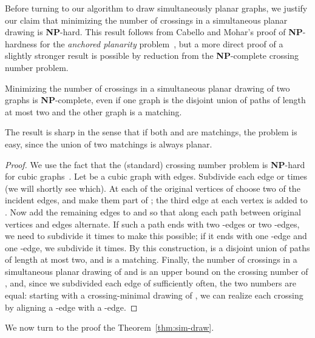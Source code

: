 \documentclass{llncs}
\newcommand{\NP}{\mbox{\bfseries NP}}
\begin{document}
Before turning to our algorithm to draw simultaneously planar graphs, we justify our claim that minimizing the number of crossings in a simultaneous planar drawing is \NP-hard. This result follows from Cabello and Mohar's proof of  \NP-hardness for the \emph{anchored planarity} problem~\cite[Theorem 2.1]{Cabello-Mohar}, but a more direct proof of a slightly stronger result is possible by reduction from the \NP-complete crossing number problem.

\begin{theorem}\label{thm:SPC}
 Minimizing the number of crossings in a simultaneous planar drawing of two graphs is \NP-complete, even if one graph is the disjoint union of paths of length at most two and the other graph is a matching.
\end{theorem}

The result is sharp in the sense that if both  and  are matchings, the problem is easy, since the union of two matchings is always planar.

\begin{proof}
We use the fact that the (standard) crossing number problem is \NP-hard for cubic graphs~\cite{H06}. Let  be a cubic graph with  edges.
Subdivide each edge  or  times (we will shortly see which). At each of the original vertices of  choose two of the incident edges, and make them part of ; the third edge at each vertex is added to . Now add the remaining edges to  and  so that along each path between original vertices  and  edges alternate. If such a path ends with two -edges or two -edges, we need to subdivide it  times to make this possible; if it ends with one -edge and one -edge, we subdivide it  times. By this construction,  is a disjoint union of paths of length at most two, and  is a matching. Finally, the number of crossings in a simultaneous planar drawing of  and  is an upper bound on the crossing number of , and, since we subdivided each edge of  sufficiently often, the two numbers are equal: starting with a crossing-minimal drawing of , we can realize each crossing by aligning a -edge with a -edge.
\end{proof}



We now turn to the proof the Theorem~\ref{thm:sim-draw}.
\end{document}
